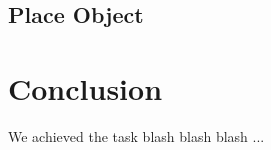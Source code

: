 \documentclass[main.tex]{subfiles}
\begin{document}
	
	
	
	\subsection{Place Object}
	
	
	
	
	\section{Conclusion}

	We achieved the task blash blash blash ...
	
	
	\endgroup
	
\end{document}
